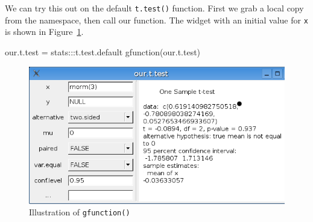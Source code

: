 \documentclass[12pt]{article}
\newcommand{\RCode}[1]{\texttt{#1}}
\newcommand{\RFunc}[1]{\texttt{#1()}}
\begin{document}
We can try this out on the default \RFunc{t.test} function. First we
grab a local copy from the namespace, then call our function. The
widget with an initial value for \RCode{x} is shown in
Figure~\ref{fig:gfunction}.


\begin{Scode}
  our.t.test = stats:::t.test.default
  gfunction(our.t.test)
\end{Scode}

\begin{figure}[htbp]
  \centering
  \includegraphics[width=.6\textwidth]{gfunction}
  \caption{Illustration of \RFunc{gfunction}}
  \label{fig:gfunction}
\end{figure}
\end{document}
